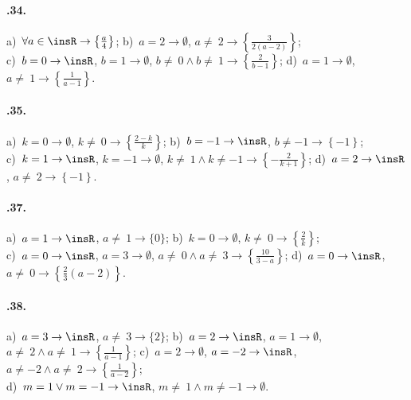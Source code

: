 \paragraph{\thechapter.34.}
a)~$\forall a\in \insR \rightarrow \left\{\frac{a}{4}\right\}$;
\quad b)~$a=2 \rightarrow \emptyset$, $a\neq~2 \rightarrow \left\{\frac{3}{2(a-2)}\right\}$;
\quad \protect\\
c)~$b=0 \rightarrow \insR$, $b=1\rightarrow\emptyset$, $b\neq~0\wedge b\neq~1\rightarrow \left\{\frac{2}{b-1}\right\}$;
\quad d)~$a=1\rightarrow \emptyset$, $a\neq~1\rightarrow \left\{\frac{1}{a-1}\right\}$.

\paragraph{\thechapter.35.}
a)~$k=0 \rightarrow \emptyset$, $k\neq~0 \rightarrow \left\{\frac{2-k}{k}\right\}$;
\quad b)~$b=-1 \rightarrow \insR$, $b\neq -1 \rightarrow \left\{-1\right\}$;
\quad \protect\\
c)~$k=1 \rightarrow \insR$, $k=-1 \rightarrow \emptyset$, $k\neq~1\wedge k\neq -1 \rightarrow \left\{-{\frac{2}{k+1}}\right\}$;
\quad d)~$a=2 \rightarrow \insR$, $a\neq~2 \rightarrow \left\{-1\right\}$.

\paragraph{\thechapter.37.}
a)~$a=1 \rightarrow \insR$, $a\neq~1 \rightarrow \{0\}$;
\quad b)~$k=0 \rightarrow \emptyset$, $k\neq~0 \rightarrow \left\{\frac{2}{k}\right\}$;
\quad \protect\\
c)~$a=0 \rightarrow \insR$, $a=3\rightarrow \emptyset$, $a\neq~0 \wedge a\neq~3 \rightarrow \left\{\frac{10}{3-a}\right\}$;
\quad d)~$a=0 \rightarrow \insR$, $a\neq~0 \rightarrow \left\{\frac{2}{3} (a-2)\right\}$.

\paragraph{\thechapter.38.}
a)~$a=3 \rightarrow \insR$, $a\neq~3 \rightarrow \{2\}$;
\quad b)~$a=2 \rightarrow \insR$, $a=1 \rightarrow \emptyset$, $a\neq~2\wedge a\neq~1 \rightarrow \left\{\frac{1}{a-1}\right\}$;
\quad c)~$a=2 \rightarrow \emptyset$, $a=-2 \rightarrow \insR$, $a\neq -2\wedge a\neq~2 \rightarrow \left\{\frac{1}{a-2}\right\}$;
\quad\protect\\
d)~$m=1\vee m=-1 \rightarrow \insR$, $m\neq~1\wedge m\neq -1 \rightarrow \emptyset$.

